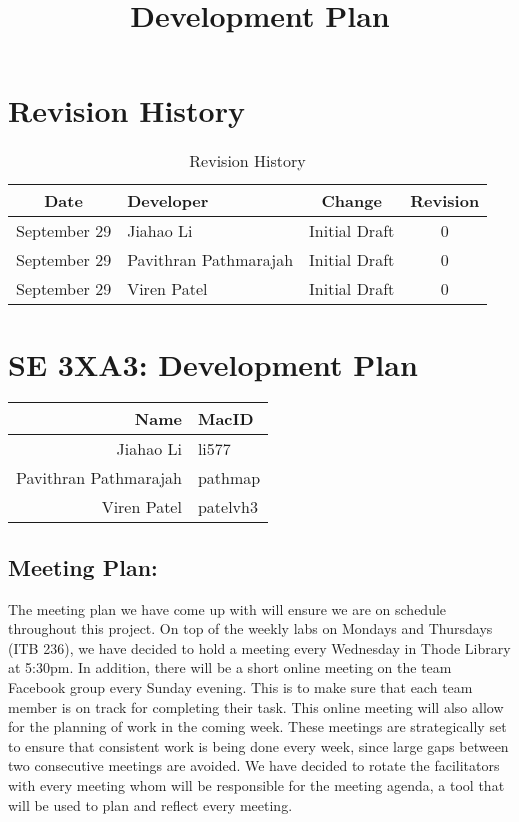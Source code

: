 \documentclass{article}
\begin{document}

\newpage
\title{Development Plan}
\hfill \break
\section*{Revision History}
\begin{table}[h!]
  \centering
  \caption{Revision History}
  \label{tab:table1}
  \begin{tabular}{clcc}
	\toprule
	Date &  Developer & Change & Revision\\
	\midrule
	September 29&Jiahao Li &Initial Draft &0\\
	September 29&Pavithran Pathmarajah &Initial Draft &0\\
	September 29&Viren Patel  &Initial Draft &0\\
	\bottomrule
  \end{tabular}
\end{table}



\newpage
{}

\section*{SE 3XA3: Development Plan}

\begin{table}[h!]

  \begin{tabular}{r l}
	\toprule
	Name &  MacID \\
	\midrule
	Jiahao Li & li577 \\
	Pavithran Pathmarajah & pathmap\\
	Viren Patel  & patelvh3\\
	\bottomrule
  \end{tabular}
\end{table}


\subsection*{Meeting Plan:}  
The meeting plan we have come up with will ensure
we are on schedule throughout this project. On top of the weekly labs on Mondays
and Thursdays (ITB 236), we have decided to hold a meeting every Wednesday in
Thode Library at 5:30pm. In addition, there will be a short online meeting on
the team Facebook group every Sunday evening. This is to make sure that each
team member is on track for completing their task. This online meeting will also
allow for the planning of work in the coming week. These meetings are
strategically set to ensure that consistent work is being done every week, since
large gaps between two consecutive meetings are avoided. We have decided to
rotate the facilitators with every meeting whom will be responsible for the
meeting agenda, a tool that will be used to plan and reflect every meeting.
\end{document}
